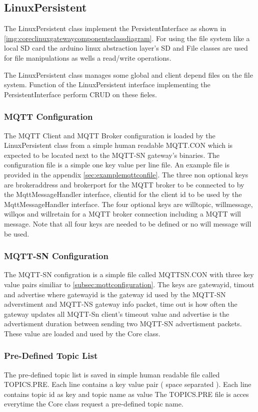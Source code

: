 \subsection{LinuxPersistent}
The LinuxPersistent class implement the PersistentInterface as shown in \autoref{img:coreclinuxgatewaycomponentsclassdiagram}.
For using the file system like a local SD card the arduino linux abstraction layer's SD and File classes are used for file manipulations as wells a read/write operations.

The LinuxPersistent class manages some global and client depend files on the file system.
Function of the LinuxPersistent interface implementing the PersistentInterface perform CRUD on these fieles.
\subsubsection{MQTT Configuration}\label{subsec:mqttconfiguration}
The MQTT Client and MQTT Broker configuration is loaded by the LinuxPersistent class from a simple human readable MQTT.CON which is expected to be located next to the MQTT-SN gateway's binaries.
The configuration file is a simple one key value per line file. An example file is provided in the appendix \autoref{sec:examplemqttconfile}.
The three non optional keys are brokeraddress and brokerport for the MQTT broker to be connected to by the MqttMessageHandler interface, clientid for the client id to be used by the MqttMessageHandler interface.
The four optional keys are willtopic, willmessage, willqos and willretain for a MQTT broker connection including a MQTT will message. Note that all four keys are needed to be defined or no will message will be used.
\subsubsection{MQTT-SN Configuration}
The MQTT-SN configration is a simple file called MQTTSN.CON with three key value pairs similiar to \autoref{subsec:mqttconfiguration}.
The keys are gatewayid, timout and advertise where gatewayid is the gateway id used by the MQTT-SN adverstiment and MQTT-NS gateway info packet,
time out is how often the gateway updates all MQTT-Sn client's timeout value and advertise is the advertisment duration between sending two MQTT-SN advertisment packets.
These value are loaded and used by the Core class.
\subsubsection{Pre-Defined Topic List}
The pre-defined topic list is saved in simple human readable file called TOPICS.PRE.
Each line contains a key value pair ( space separated ).
Each line contains topic id as key and topic name as value
The TOPICS.PRE file is acces everytime the Core class request a pre-defined topic name.
